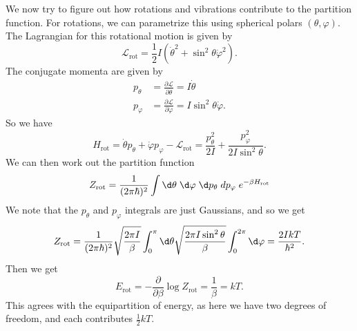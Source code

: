 \documentclass[a4paper]{article}
\begin{document}
We now try to figure out how rotations and vibrations contribute to the partition function. For rotations, we can parametrize this using spherical polars $(\theta, \varphi)$. The Lagrangian for this rotational motion is given by
\[
  \mathcal{L}_{\mathrm{rot}} = \frac{1}{2} I (\dot{\theta}^2 + \sin^2 \theta \dot{\varphi}^2).
\]
The conjugate momenta are given by
\begin{align*}
  p_\theta &= \frac{\partial \mathcal{L}}{\partial \dot{\theta}} = I \dot{\theta}\\
  p_\varphi &= \frac{\partial \mathcal{L}}{\partial \dot{\varphi}} = I \sin^2 \theta \dot\varphi.
\end{align*}
So we have
\[
  H_{\mathrm{rot}} = \dot{\theta} p_\theta + \dot{\varphi} p_\varphi - \mathcal{L}_{\mathrm{rot}} = \frac{p_\theta^2}{2I} + \frac{p_\varphi^2}{2I \sin^2 \theta}.
\]
We can then work out the partition function
\[
  Z_{\mathrm{rot}} = \frac{1}{(2\pi \hbar)^2} \int \d \theta\; \d \varphi\; \d p_\theta \; d p_\varphi\; e^{-\beta H_{\mathrm{rot}}}
\]
We note that the $p_\theta$ and $p_\varphi$ integrals are just Gaussians, and so we get
\[
  Z_{\mathrm{rot}} = \frac{1}{(2\pi \hbar)^2} \sqrt{\frac{2\pi I}{\beta}} \int_0^\pi \d \theta \sqrt{\frac{2\pi I \sin^2 \theta}{\beta}} \int_0^{2\pi} \d \varphi = \frac{2IkT}{\hbar^2}.
\]
Then we get
\[
  E_{\mathrm{rot}} = - \frac{\partial}{\partial \beta} \log Z_{\mathrm{rot}} = \frac{1}{\beta} = kT.
\]
This agrees with the equipartition of energy, as here we have two degrees of freedom, and each contributes $\frac{1}{2}kT$.
\end{document}
